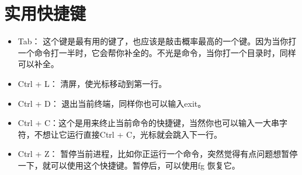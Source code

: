\section{实用快捷键}
\begin{itemize}
\item
Tab： 这个键是最有用的键了，也应该是敲击概率最高的一个键。因为当你打一个命令打一半时，它会帮你补全的。不光是命令，当你打一个目录时，同样可以补全。
\item
Ctrl + L： 清屏，使光标移动到第一行。
\item
Ctrl + D： 退出当前终端，同样你也可以输入exit。
\item
Ctrl + C：这个是用来终止当前命令的快捷键，当然你也可以输入一大串字符，不想让它运行直接Ctrl + C，光标就会跳入下一行。 
\item
Ctrl + Z： 暂停当前进程，比如你正运行一个命令，突然觉得有点问题想暂停一下，就可以使用这个快捷键。暂停后，可以使用fg 恢复它。
\end{itemize}
